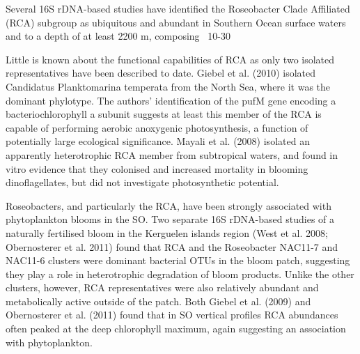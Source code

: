 Several 16S rDNA-based studies have identified the Roseobacter Clade Affiliated (RCA) subgroup as ubiquitous and abundant in Southern Ocean surface waters and to a depth of at least 2200 m, composing ~10-30%

Little is known about the functional capabilities of RCA as only two isolated representatives have been described to date. Giebel et al. (2010) isolated Candidatus Planktomarina temperata from the North Sea, where it was the dominant phylotype. The authors' identification of the pufM gene encoding a bacteriochlorophyll a subunit suggests at least this member of the RCA is capable of performing aerobic anoxygenic photosynthesis, a function of potentially large ecological significance. Mayali et al. (2008) isolated an apparently heterotrophic RCA member from subtropical waters, and found in vitro evidence that they colonised and increased mortality in blooming dinoflagellates, but did not investigate photosynthetic potential.

Roseobacters, and particularly the RCA, have been strongly associated with phytoplankton blooms in the SO. Two separate 16S rDNA-based studies of a naturally fertilised bloom in the Kerguelen islands region (West et al. 2008; Obernosterer et al. 2011) found that RCA and the Roseobacter NAC11-7 and NAC11-6 clusters were dominant bacterial OTUs in the bloom patch, suggesting they play a role in heterotrophic degradation of bloom products. Unlike the other clusters, however, RCA representatives were also relatively abundant and metabolically active outside of the patch. Both Giebel et al. (2009) and Obernosterer et al. (2011) found that in SO vertical profiles RCA abundances often peaked at the deep chlorophyll maximum, again suggesting an association with phytoplankton.


